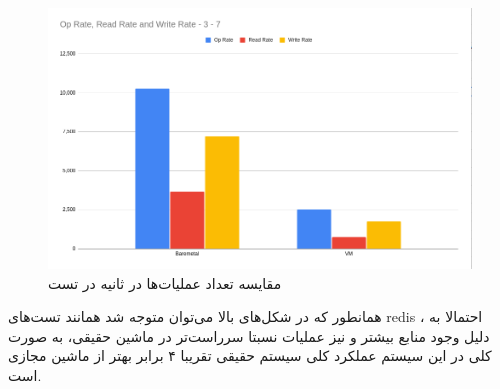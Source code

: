 \begin{figure}[H]
    \centering
    \includegraphics[scale=0.5]{pictures/cassandra/overall_result-7-3.png}
    \caption{ مقایسه تعداد عملیات‌ها در ثانیه در تست }
    \label{fig:cassandra:init:overall_results1}
\end{figure}
همانطور که در شکل‌های بالا می‌توان متوجه شد همانند تست‌های redis 
، احتمالا به دلیل وجود منابع بیشتر و نیز عملیات نسبتا سرراست‌تر در ماشین حقیقی،‌ به صورت کلی در این سیستم عملکرد کلی سیستم حقیقی تقریبا ۴ برابر بهتر از ماشین مجازی است.